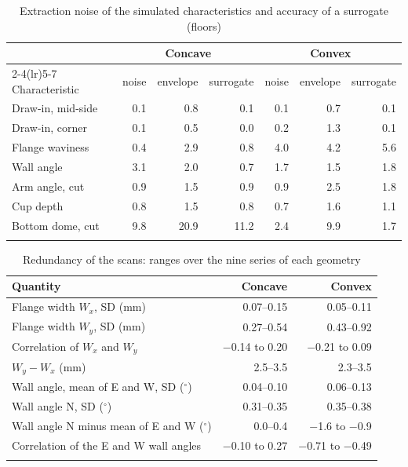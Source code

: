 \documentclass[pdflatex,sn-basic]{sn-jnl}
\newcommand{\tabsize}{\fontsize{8}{9.5}\selectfont}
\begin{document}
\begin{table}[tbp]
\tabsize
\setlength{\tabcolsep}{4.5pt}
\caption{Extraction noise of the simulated characteristics and accuracy of a surrogate (floors)}\label{tab:simnoise}
\begin{tabular}{@{}lrrrrrr@{}}
\toprule
 & \multicolumn{3}{c}{Concave} & \multicolumn{3}{c}{Convex} \\
\cmidrule(lr){2-4}\cmidrule(lr){5-7}
Characteristic & noise & envelope & surrogate & noise & envelope & surrogate \\
\midrule
Draw-in, mid-side & 0.1 & 0.8 & 0.1 & 0.1 & 0.7 & 0.1 \\
Draw-in, corner & 0.1 & 0.5 & 0.0 & 0.2 & 1.3 & 0.1 \\
Flange waviness & 0.4 & 2.9 & 0.8 & 4.0 & 4.2 & 5.6 \\
Wall angle & 3.1 & 2.0 & 0.7 & 1.7 & 1.5 & 1.8 \\
Arm angle, cut & 0.9 & 1.5 & 0.9 & 0.9 & 2.5 & 1.8 \\
Cup depth & 0.8 & 1.5 & 0.8 & 0.7 & 1.6 & 1.1 \\
Bottom dome, cut & 9.8 & 20.9 & 11.2 & 2.4 & 9.9 & 1.7 \\
\botrule
\end{tabular}
\end{table}

\begin{table}[tbp]
\tabsize
\setlength{\tabcolsep}{6pt}
\caption{Redundancy of the scans: ranges over the nine series of each geometry}\label{tab:scan}
\begin{tabular}{@{}lrr@{}}
\toprule
Quantity & Concave & Convex \\
\midrule
Flange width $W_x$, SD (mm) & 0.07--0.15 & 0.05--0.11 \\
Flange width $W_y$, SD (mm) & 0.27--0.54 & 0.43--0.92 \\
Correlation of $W_x$ and $W_y$ & $-$0.14 to 0.20 & $-$0.21 to 0.09 \\
$W_y-W_x$ (mm) & 2.5--3.5 & 2.3--3.5 \\
Wall angle, mean of E and W, SD ($^\circ$) & 0.04--0.10 & 0.06--0.13 \\
Wall angle N, SD ($^\circ$) & 0.31--0.35 & 0.35--0.38 \\
Wall angle N minus mean of E and W ($^\circ$) & 0.0--0.4 & $-$1.6 to $-$0.9 \\
Correlation of the E and W wall angles & $-$0.10 to 0.27 & $-$0.71 to $-$0.49 \\
\botrule
\end{tabular}
\end{table}
\end{document}
